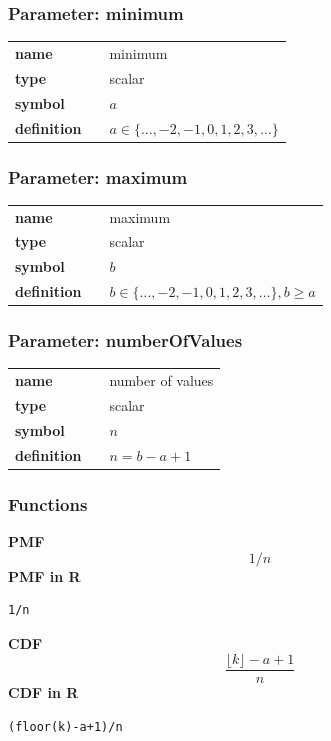 \subsubsection*{Parameter: minimum}

\noindent\begin{tabular}{p{2cm}cl}
\textbf{name} & & minimum \\
\textbf{type} & & scalar \\
\textbf{symbol} & & $a$  \\
\textbf{definition} & & $a \in \{\dots,-2,-1,0,1,2,3,\dots\}$
\end{tabular}
\subsubsection*{Parameter: maximum}

\noindent\begin{tabular}{p{2cm}cl}
\textbf{name} & & maximum \\
\textbf{type} & & scalar \\
\textbf{symbol} & & $b$  \\
\textbf{definition} & & $b \in \{\dots,-2,-1,0,1,2,3,\dots\}, b \ge a$
\end{tabular}
\subsubsection*{Parameter: numberOfValues}

\noindent\begin{tabular}{p{2cm}cl}
\textbf{name} & & number of values \\
\textbf{type} & & scalar \\
\textbf{symbol} & & $n$  \\
\textbf{definition} & & $n=b-a+1$
\end{tabular}
\subsubsection*{Functions}

\smallskip \noindent \hspace{.2cm} \textbf{PMF} 
\begin{equation*}1/n\end{equation*}
\smallskip \noindent \hspace{.2cm} \textbf{PMF in R}  
\begin{verbatim}1/n\end{verbatim}
\smallskip \noindent \hspace{.2cm} \textbf{CDF} 
\begin{equation*}\frac{\lfloor k \rfloor -a+1}{n}\end{equation*}
\smallskip \noindent \hspace{.2cm} \textbf{CDF in R} 
\begin{verbatim}(floor(k)-a+1)/n\end{verbatim}
\smallskip
